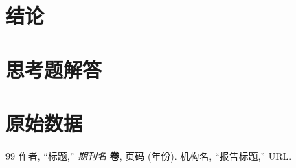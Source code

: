 \documentclass[UTF8,a4paper,12pt]{ctexart}
\begin{document}
\section{结论}


\newpage
\appendix
\section{思考题解答}


\clearpage
\section{原始数据}


\clearpage
\begin{thebibliography}{99}
 作者, ``标题,'' \textit{期刊名} \textbf{卷}, 页码 (年份).
 机构名, ``报告标题,'' URL.
\end{thebibliography}
\end{document}
